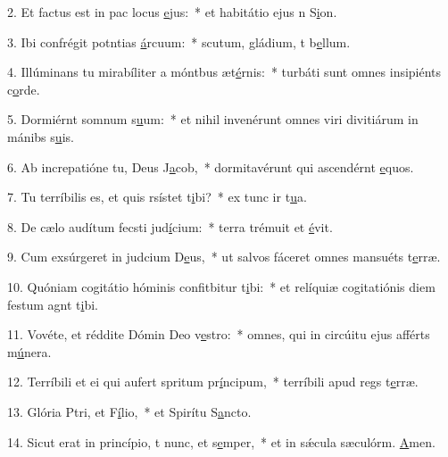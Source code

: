 2. Et factus est in pac locus \uline{e}jus:~* et habitátio ejus n S\uline{i}on.\par 
3. Ibi confrégit potntias \uline{á}rcuum:~* scutum, gládium, t b\uline{e}llum.\par 
4. Illúminans tu mirabíliter a móntbus æt\uline{é}rnis:~* turbáti sunt omnes insipiénts c\uline{o}rde.\par 
5. Dormiérnt somnum s\uline{u}um:~* et nihil invenérunt omnes viri divitiárum in mánibs s\uline{u}is.\par 
6. Ab increpatióne tu, Deus J\uline{a}cob,~* dormitavérunt qui ascendérnt \uline{e}quos.\par 
7. Tu terríbilis es, et quis rsístet t\uline{i}bi?~* ex tunc ir t\uline{u}a.\par 
8. De cælo audítum fecsti jud\uline{í}cium:~* terra trémuit et \uline{é}vit.\par 
9. Cum exsúrgeret in judcium D\uline{e}us,~* ut salvos fáceret omnes mansuéts t\uline{e}rræ.\par 
10. Quóniam cogitátio hóminis confitbitur t\uline{i}bi:~* et relíquiæ cogitatiónis diem festum agnt t\uline{i}bi.\par 
11. Vovéte, et réddite Dómin Deo v\uline{e}stro:~* omnes, qui in circúitu ejus afférts m\uline{ú}nera.\par 
12. Terríbili et ei qui aufert spritum pr\uline{í}ncipum,~* terríbili apud regs t\uline{e}rræ.\par 
13. Glória Ptri, et F\uline{í}lio,~* et Spirítu S\uline{a}ncto.\par 
14. Sicut erat in princípio, t nunc, et s\uline{e}mper,~* et in sǽcula sæculórm. \uline{A}men.\par 
